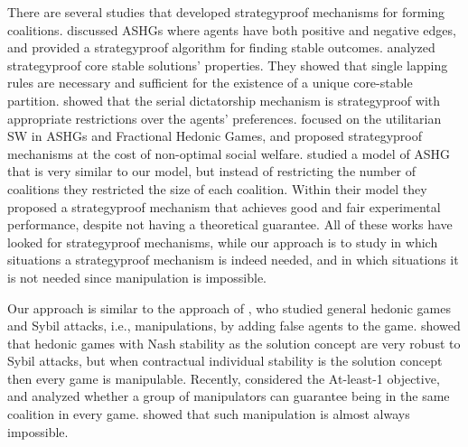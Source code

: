 \documentclass{article}
\begin{document}
There are several studies that developed strategyproof mechanisms for forming coalitions. 
\citeauthor{dimitrov2004enemies}  discussed ASHGs where agents have both positive and negative edges, and provided a strategyproof algorithm for finding stable outcomes.
\citeauthor{rodriguez2009strategy}  analyzed strategyproof core stable solutions' properties. They showed that single lapping rules are necessary and sufficient for the existence of a unique core-stable partition.
\citeauthor{aziz2013pareto}  showed that the serial dictatorship mechanism is strategyproof with appropriate restrictions over the agents' preferences. 
\citeauthor{flammini2017strategyproof}  focused on the utilitarian SW in ASHGs and Fractional Hedonic Games, and proposed strategyproof mechanisms at the cost of non-optimal social welfare.
\citeauthor{wright2015mechanism}  studied a model of ASHG that is very similar to our model, but instead of restricting the number of coalitions they restricted the size of each coalition. Within their model they proposed a strategyproof mechanism that achieves good and fair experimental performance, despite not having a theoretical guarantee.
All of these works have looked for strategyproof mechanisms, while our approach is to study in which situations a strategyproof mechanism is indeed needed, and in which situations it is not needed since manipulation is impossible.

Our approach is similar to the approach of 
\citeauthor{vallee2014study} , who studied general hedonic games and Sybil attacks, i.e., manipulations, by adding false agents to the game. \citeauthor{vallee2014study} showed that hedonic games with Nash stability as the solution concept are very robust to Sybil attacks, but when contractual individual stability is the solution concept then every game is manipulable. 
Recently, \citeauthor{alonhighschool}  considered the At-least-1 objective, and analyzed whether a group of manipulators can guarantee being in the same coalition in every game. \citeauthor{alonhighschool} showed that such manipulation is almost always impossible.
\end{document}

